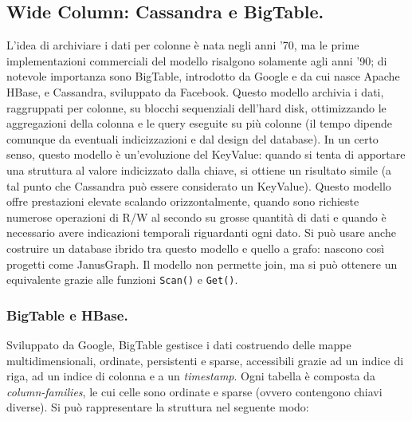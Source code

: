 \documentclass[a4page, 11pt]{article}
\begin{document}
\subsection{Wide Column: Cassandra\cite{Cassandra} e BigTable.}
L'idea di archiviare i dati per colonne è nata negli anni '70, ma le prime implementazioni commerciali del modello risalgono solamente agli anni '90; di notevole importanza sono BigTable, introdotto da Google e da cui nasce Apache HBase, e Cassandra, sviluppato da Facebook.
Questo modello archivia i dati, raggruppati per colonne, su blocchi sequenziali dell'hard disk, ottimizzando le aggregazioni della colonna e le query eseguite su più colonne (il tempo dipende comunque da eventuali indicizzazioni e dal design del database).
In un certo senso, questo modello è un'evoluzione del KeyValue: quando si tenta di apportare una struttura al valore indicizzato dalla chiave, si ottiene un risultato simile (a tal punto che Cassandra può essere considerato un KeyValue).
Questo modello offre prestazioni elevate scalando orizzontalmente, quando sono richieste numerose operazioni di R/W al secondo su grosse quantità di dati e quando è necessario avere indicazioni temporali riguardanti ogni dato.
Si può usare anche costruire un database ibrido tra questo modello e quello a grafo: nascono così progetti come JanusGraph.
Il modello non permette join, ma si può ottenere un equivalente grazie alle funzioni \verb|Scan()| e \verb|Get()|.

\subsubsection*{BigTable e HBase.}
Sviluppato da Google, BigTable gestisce i dati costruendo delle mappe multidimensionali, ordinate, persistenti e sparse, accessibili grazie ad un indice di riga, ad un indice di colonna e a un \textit{timestamp}.
Ogni tabella è composta da \textit{column-families}, le cui celle sono ordinate e sparse (ovvero contengono chiavi diverse).
Si può rappresentare la struttura nel seguente modo:
\end{document}
